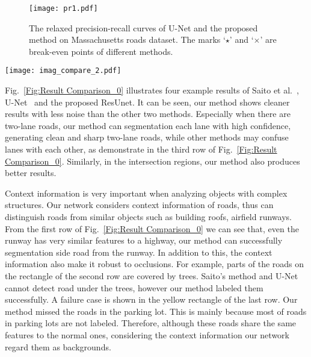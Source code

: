 \documentclass[journal]{IEEEtran}
\begin{document}
\begin{figure}[!t]
\begin{center}
		\texttt{[image: pr1.pdf]}
	    \caption{The relaxed precision-recall curves of U-Net and the proposed method on Massachusetts roads dataset. The marks `$\star$' and `$\times$' are break-even points of different methods.}
	    \label{Fig:PR}
\end{center}
\vspace{-0.5cm}
\end{figure}

\begin{figure*}[ht]
\begin{center}
		\texttt{[image: imag\_compare\_2.pdf]}
	    \caption{Example results on the test set of Massachusetts roads dataset. (a) Input image; (b) Ground truth; (c) Saito et al.~\cite{Saito2016Multiple}; (d) U-Net~\cite{U-NET2015}; (e) The proposed ResUnet. Zoom in to see more details.}
	    \label{Fig:Result Comparison_0}
\end{center}
\vspace{-0.6cm}
\end{figure*}

Fig.~\ref{Fig:Result Comparison_0} illustrates four example results of Saito et al.~\cite{Saito2016Multiple}, U-Net~\cite{U-NET2015} and the proposed ResUnet. It can be seen, our method shows cleaner results with less noise than the other two methods. Especially when there are two-lane roads, our method can segmentation each lane with high confidence, generating clean and sharp two-lane roads, while other methods may confuse lanes with each other, as demonstrate in the third row of Fig.~\ref{Fig:Result Comparison_0}. Similarly, in the intersection regions, our method also produces better results.

Context information is very important when analyzing objects with complex structures. Our network considers context information of roads, thus can distinguish roads from similar objects such as building roofs, airfield runways. From the first row of Fig.~\ref{Fig:Result Comparison_0} we can see that, even the runway has very similar features to a highway, our method can successfully segmentation side road from the runway. In addition to this, the context information also make it robust to occlusions. For example, parts of the roads on the rectangle of the second row are covered by trees. Saito's method and U-Net cannot detect road under the trees, however our method labeled them successfully. A failure case is shown in the yellow rectangle of the last row. Our method missed the roads in the parking lot. This is mainly because most of roads in parking lots are not labeled. Therefore, although these roads share the same features to the normal ones, considering the context information our network regard them as backgrounds. 
\end{document}

